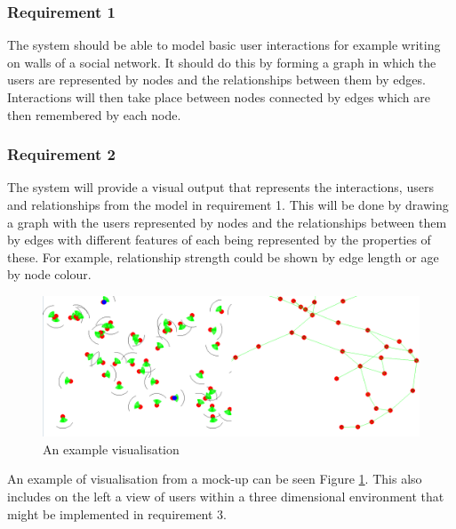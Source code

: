\documentclass[12pt,a4paper]{article}
\begin{document}
\subsubsection{Requirement 1}
The system should be able to model basic user interactions for example writing on walls of a social network. It should do this by forming a graph in which the users are represented by nodes and the relationships between them by edges. Interactions will then take place between nodes connected by edges which are then remembered by each node.

\subsubsection{Requirement 2}
The system will provide a visual output that represents the interactions, users and relationships from the model in requirement 1. This will be done by drawing a graph with the users represented by nodes and the relationships between them by edges with different features of each being represented by the properties of these. For example, relationship strength could be shown by edge length or age by node colour.
\begin{figure}[htb]
\begin{center}
\caption{An example visualisation}
\label{fig:visualexample}
\includegraphics[width=6in]{screen}
\end{center}
\end{figure}

An example of visualisation from a mock-up can be seen Figure \ref{fig:visualexample}. This also includes on the left a view of users within a three dimensional environment that might be implemented in requirement 3.
\end{document}
